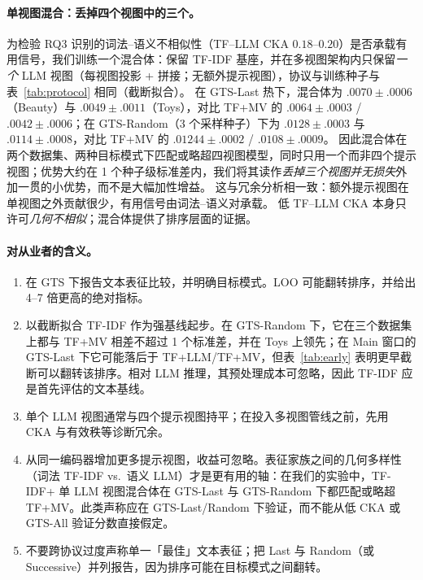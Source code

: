 \documentclass[sigconf,natbib=true,anonymous]{acmart}
\newcommand{\tfidf}{\textsc{TF-IDF}\xspace}
\newcommand{\llm}{\textsc{LLM}\xspace}
\newcommand{\tfllm}{\textsc{TF+LLM}\xspace}
\newcommand{\tfmv}{\textsc{TF+MV}\xspace}
\begin{document}
\paragraph{单视图混合：丢掉四个视图中的三个。}
为检验 RQ3 识别的词法--语义不相似性（TF--LLM CKA $0.18$--$0.20$）是否承载有用信号，我们训练一个混合体：保留 \tfidf 基座，并在多视图架构内只保留\emph{一个} LLM 视图（每视图投影 + 拼接；无额外提示视图），协议与训练种子与表~\ref{tab:protocol} 相同（截断拟合）。
在 GTS-Last 热下，混合体为 $.0070\pm.0006$（Beauty）与 $.0049\pm.0011$（Toys），对比 \tfmv 的 $.0064\pm.0003$ / $.0042\pm.0006$；在 GTS-Random（3 个采样种子）下为 $.0128\pm.0003$ 与 $.0114\pm.0008$，对比 \tfmv 的 $.01244\pm.0002$ / $.0108\pm.0009$。
因此混合体在两个数据集、两种目标模式下匹配或略超四视图模型，同时只用一个而非四个提示视图；优势大约在 1 个种子级标准差内，我们将其读作\emph{丢掉三个视图并无损失}外加一贯的小优势，而不是大幅加性增益。
这与冗余分析相一致：额外提示视图在单视图之外贡献很少，有用信号由词法--语义对承载。
低 TF--LLM CKA 本身只许可\emph{几何不相似}；混合体提供了排序层面的证据。

\paragraph{对从业者的含义。}
\begin{enumerate}[leftmargin=*,itemsep=2pt]
\item 在 GTS 下报告文本表征比较，并明确目标模式。LOO 可能翻转排序，并给出 4--7 倍更高的绝对指标。
\item 以截断拟合 \tfidf 作为强基线起步。在 GTS-Random 下，它在三个数据集上都与 \tfmv 相差不超过 1 个标准差，并在 Toys 上领先；在 Main 窗口的 GTS-Last 下它可能落后于 \tfllm/\tfmv，但表~\ref{tab:early} 表明更早截断可以翻转该排序。相对 LLM 推理，其预处理成本可忽略，因此 TF-IDF 应是首先评估的文本基线。
\item 单个 \llm 视图通常与四个提示视图持平；在投入多视图管线之前，先用 CKA 与有效秩等诊断冗余。
\item 从同一编码器增加更多提示视图，收益可忽略。表征家族之间的几何多样性（词法 \tfidf vs.\ 语义 \llm）才是更有用的轴：在我们的实验中，\tfidf + 单 LLM 视图混合体在 GTS-Last 与 GTS-Random 下都匹配或略超 \tfmv。此类声称应在 GTS-Last/Random 下验证，而不能从低 CKA 或 GTS-All 验证分数直接假定。
\item 不要跨协议过度声称单一「最佳」文本表征；把 Last 与 Random（或 Successive）并列报告，因为排序可能在目标模式之间翻转。
\end{enumerate}
\end{document}
